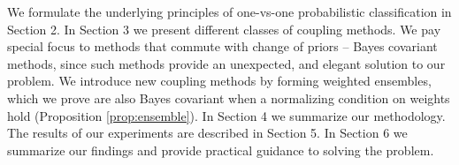 \documentclass[twoside,11pt]{article}
\begin{document}
We formulate the underlying principles of one-vs-one probabilistic classification in Section 2. In Section 3 we present  different classes of coupling methods. We pay special focus to methods that commute with change of priors -- Bayes covariant methods, since such methods provide an unexpected, and elegant solution to our problem. We introduce new coupling methods by forming weighted ensembles, which we prove are also Bayes covariant when a normalizing condition on weights hold (Proposition \ref{prop:ensemble}).  In Section 4 we summarize our methodology. The results of our experiments are described in Section 5. In Section 6 we summarize our findings and provide practical guidance to solving the problem.













\newpage




\vskip 0.2in 

\end{document}
